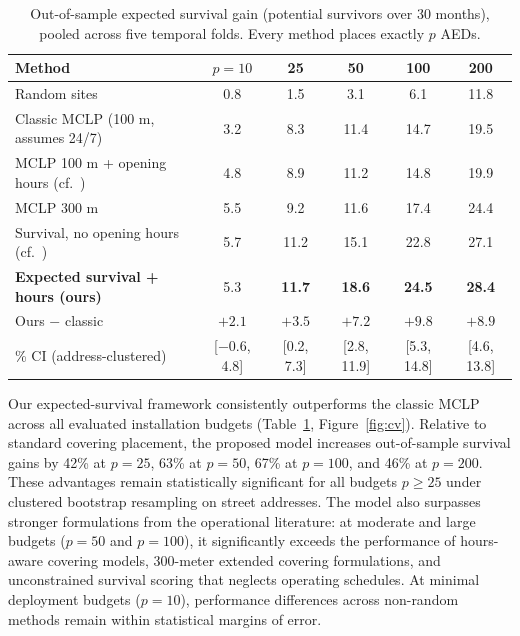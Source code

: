 \documentclass[11pt]{article}
\begin{document}
\begin{table}[htbp]
\centering\footnotesize\setlength{\tabcolsep}{4pt}
\begin{tabular}{lccccc}
\toprule
Method & $p=10$ & 25 & 50 & 100 & 200\\
\midrule
Random sites & 0.8 & 1.5 & 3.1 & 6.1 & 11.8\\
Classic MCLP (100 m, assumes 24/7) \cite{church1974} & 3.2 & 8.3 & 11.4 & 14.7 & 19.5\\
MCLP 100 m + opening hours (cf.\ \cite{sun2016}) & 4.8 & 8.9 & 11.2 & 14.8 & 19.9\\
MCLP 300 m & 5.5 & 9.2 & 11.6 & 17.4 & 24.4\\
Survival, no opening hours (cf.\ \cite{pourghaderi2021}) & 5.7 & 11.2 & 15.1 & 22.8 & 27.1\\
\textbf{Expected survival + hours (ours)} & 5.3 & \textbf{11.7} & \textbf{18.6} & \textbf{24.5} & \textbf{28.4}\\
\midrule
Ours $-$ classic & $+2.1$ & $+3.5$ & $+7.2$ & $+9.8$ & $+8.9$\\
\quad 95\% CI (address-clustered) & [$-0.6$, 4.8] & [0.2, 7.3] & [2.8, 11.9] & [5.3, 14.8] & [4.6, 13.8]\\
\bottomrule
\end{tabular}
\caption{Out-of-sample expected survival gain (potential survivors over 30 months), pooled across five temporal folds. Every method places exactly $p$ AEDs.}
\label{tab:cv}
\end{table}

Our expected-survival framework consistently outperforms the classic MCLP across all evaluated installation budgets (Table~\ref{tab:cv}, Figure~\ref{fig:cv}). Relative to standard covering placement, the proposed model increases out-of-sample survival gains by 42\% at $p=25$, 63\% at $p=50$, 67\% at $p=100$, and 46\% at $p=200$. These advantages remain statistically significant for all budgets $p\ge 25$ under clustered bootstrap resampling on street addresses. The model also surpasses stronger formulations from the operational literature: at moderate and large budgets ($p=50$ and $p=100$), it significantly exceeds the performance of hours-aware covering models, 300-meter extended covering formulations, and unconstrained survival scoring that neglects operating schedules. At minimal deployment budgets ($p=10$), performance differences across non-random methods remain within statistical margins of error.
\end{document}
